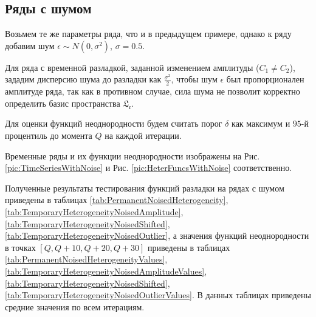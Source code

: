 \documentclass[specialist, substylefile = spbu.rtx,
			   subf, href, 12pt]{disser}
\begin{document}
\newpage
\subsection{Ряды с шумом}
Возьмем те же параметры ряда, что и в предыдущем примере, однако к ряду добавим шум $\epsilon \sim N(0, \sigma^2)$, $\sigma = 0.5$. 

Для ряда с временной разладкой, заданной изменением амплитуды ($C_1 \neq C_2$), зададим дисперсию шума до разладки как $\frac{\sigma^2}{2}$, чтобы шум $\epsilon$ был пропорционален амплитуде ряда, так как в противном случае, сила шума не позволит корректно определить базис пространства $ \mathfrak{L_r} $. 

Для оценки функций неоднородности будем считать порог $ \delta $ как максимум и $ 95 $-й процентиль до момента $ Q $ на каждой итерации.

Временные ряды и их функции неоднородности изображены на Рис. \ref{pic:TimeSeriesWithNoise} и Рис. \ref{pic:HeterFuncsWithNoise} соответственно.

Полученные результаты тестирования функций разладки на рядах с шумом приведены в таблицах \ref{tab:PermanentNoisedHeterogeneity}, \ref{tab:TemporaryHeterogeneityNoisedAmplitude}, \ref{tab:TemporaryHeterogeneityNoisedShifted}, \ref{tab:TemporaryHeterogeneityNoisedOutlier}, а значения функций неоднородности в точках $[Q, Q+10, Q+20, Q+30] $ приведены в таблицах \ref{tab:PermanentNoisedHeterogeneityValues}, \ref{tab:TemporaryHeterogeneityNoisedAmplitudeValues}, \ref{tab:TemporaryHeterogeneityNoisedShifted}, \ref{tab:TemporaryHeterogeneityNoisedOutlierValues}. В данных таблицах приведены средние значения по всем итерациям.
\end{document}
